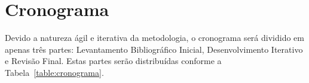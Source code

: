 \documentclass[
	12pt,				%
	openright,			%
	oneside,			%
	a4paper,			%
	chapter=TITLE,		%
	english,			%
	french,				%
	spanish,			%
	brazil				%
	]{abntex2}
\begin{document}
{%


\chapter{Cronograma}


Devido a natureza ágil e iterativa da metodologia, o cronograma será dividido em apenas três partes: Levantamento Bibliográfico Inicial, Desenvolvimento Iterativo e Revisão Final. Estas partes serão distribuídas conforme a Tabela~\ref{table:cronograma}.

\begin{table}[htb]
\end{table}

















}
\end{document}
